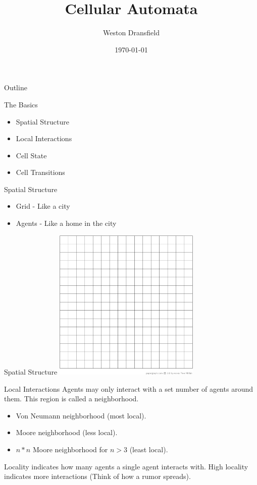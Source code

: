 \documentclass[bigger]{beamer}
\author{Weston Dransfield}
\date{\today}
\title{Cellular Automata}
\begin{document}
\maketitle
\begin{frame}{Outline}
\tableofcontents
\end{frame}


\begin{frame}[label=sec-1]{The Basics}
\begin{itemize}
\item<1-> Spatial Structure
\item<2-> Local Interactions
\item<3-> Cell State
\item<4-> Cell Transitions
\end{itemize}
\end{frame}

\begin{frame}[label=sec-2]{Spatial Structure}
\begin{itemize}
\item<1-> Grid - Like a city
\item<2-> Agents - Like a home in the city
\end{itemize}
\end{frame}

\begin{frame}[label=sec-3]{Spatial Structure}
\includegraphics[width=7cm]{images/grid.png}
\end{frame}

\begin{frame}[label=sec-4]{Local Interactions}
Agents may only interact with a set number of agents around them. This region is called a neighborhood.
\begin{itemize}
\item<1->Von Neumann neighborhood (most local).
\item<2->Moore neighborhood (less local).
\item<3->\(n*n\) Moore neighborhood for \(n > 3\) (least local).
\end{itemize}
\pause
\pause
\pause
Locality indicates how many agents a single agent interacts with. High locality indicates more interactions (Think of how a rumor spreads).
\end{frame}
\end{document}
